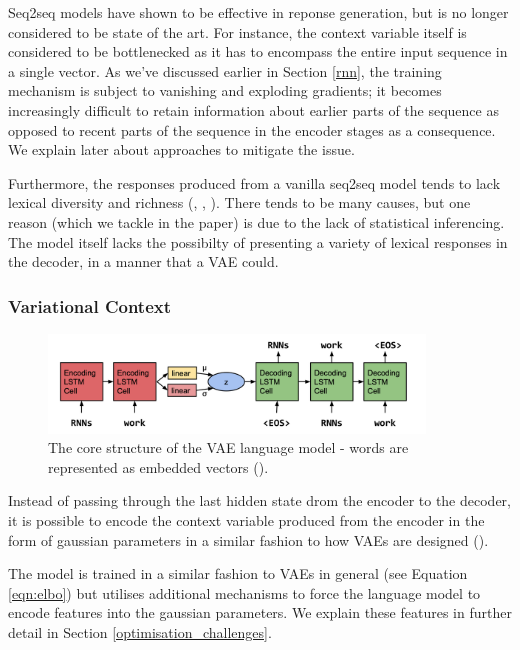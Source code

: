 \documentclass[12pt,twoside]{report}
\begin{document}
Seq2seq models have shown to be effective in reponse generation, but is no longer considered to be state of the art. For instance, the context variable itself is considered to be bottlenecked as it has to encompass the entire input sequence in a single vector. As we've discussed earlier in Section \ref{rnn}, the training mechanism is subject to vanishing and exploding gradients; it becomes increasingly difficult to retain information about earlier parts of the sequence as opposed to recent parts of the sequence in the encoder stages as a consequence. We explain later about approaches to mitigate the issue.

Furthermore, the responses produced from a vanilla seq2seq model tends to lack lexical diversity and richness (\cite{serban_hierarchical_2016}, \cite{zhao_learning_2017}, \cite{jiang_why_2018}). There tends to be many causes, but one reason (which we tackle in the paper) is due to the lack of statistical inferencing. The model itself lacks the possibilty of presenting a variety of lexical responses in the decoder, in a manner that a VAE could.

\subsubsection{Variational Context}
\label{variational_context}

\begin{figure}[!ht]
	\centering
	\includegraphics[width=100mm]{diagrams/seq2seqvae.png}
	\caption{The core structure of the VAE language model - words are represented as embedded vectors (\cite{bowman_generating_2015}). \label{vae_seq2seq}}
\end{figure}

Instead of passing through the last hidden state drom the encoder to the decoder, it is possible to encode the context variable produced from the encoder in the form of gaussian parameters in a similar fashion to how VAEs are designed (\cite{bowman_generating_2015}).  

The model is trained in a similar fashion to VAEs in general (see Equation \ref{eqn:elbo}) but utilises additional mechanisms to force the language model to encode features into the gaussian parameters. We explain these features in further detail in Section \ref{optimisation_challenges}.
\end{document}
